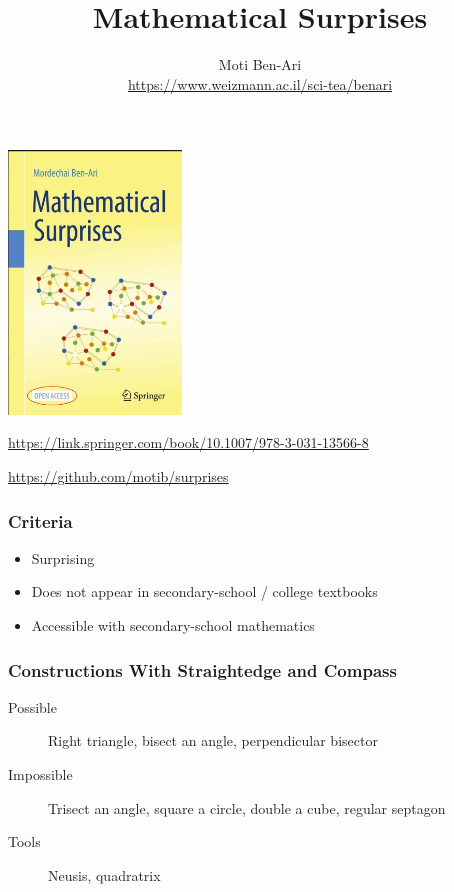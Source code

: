 \documentclass{beamer}
\title{Mathematical Surprises}
\author{Moti Ben-Ari\\\url{https://www.weizmann.ac.il/sci-tea/benari}}
\institute{Department of Science Teaching\\
Weizmann Institute of Science}
\date{}
\begin{document}
\frame{\titlepage}


\begin{frame}
\begin{center}
\vspace*{-5ex}
\includegraphics[height=7cm]{surprises-cover}
\end{center}
\small\url{https://link.springer.com/book/10.1007/978-3-031-13566-8}

\medskip

\small\url{https://github.com/motib/surprises}
\end{frame}


\begin{frame}
\frametitle{Criteria}

\begin{itemize}
\item Surprising
\item Does not appear in secondary-school / college textbooks
\item Accessible with secondary-school mathematics
\end{itemize}

\end{frame}



\begin{frame}
\frametitle{Constructions With Straightedge and Compass}

\pause

\begin{description}
\item[Possible] Right triangle, bisect an angle, perpendicular bisector

\bigskip

\item[Impossible] Trisect an angle, square a circle, double a cube, regular septagon

\pause

\bigskip

\item[Tools] Neusis, quadratrix
\end{description}
\end{frame}
\end{document}
